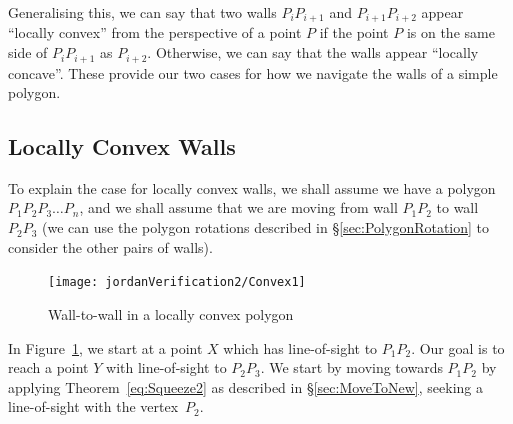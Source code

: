 Generalising this, we can say that two walls $P_{i}P_{i+1}$ and $P_{i+1}P_{i+2}$ appear ``locally convex'' from the perspective of a point $P$ if the point $P$ is on the same side of $P_{i}P_{i+1}$ as $P_{i+2}$. Otherwise, we can say that the walls appear ``locally concave''. These provide our two cases for how we navigate the walls of a simple polygon.

\subsection{Locally Convex Walls}\label{sec:ConcaveMove}
To explain the case for locally convex walls, we shall assume we have a polygon $P_1P_2P_3\ldots P_n$, and we shall assume that we are moving from wall $P_1P_2$ to wall $P_2P_3$ (we can use the polygon rotations described in \S\ref{sec:PolygonRotation} to consider the other pairs of walls).

\begin{figure}
\centering\texttt{[image: jordanVerification2/Convex1]}
\caption{Wall-to-wall in a locally convex polygon}
\label{fig:Convex1}
\end{figure}

In Figure~\ref{fig:Convex1}, we start at a point $X$ which has line-of-sight to $P_1P_2$. Our goal is to reach a point $Y$ with line-of-sight to $P_2P_3$. We start by moving towards $P_1P_2$ by applying Theorem~\ref{eq:Squeeze2} as described in \S\ref{sec:MoveToNew}, seeking a line-of-sight with the vertex~$P_2$. 



